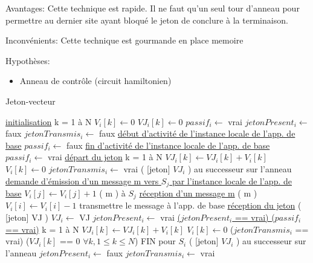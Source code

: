 \documentclass[a4paper,11pt]{article}
\begin{document}
Avantages: Cette technique est rapide. Il ne faut qu'un seul tour d’anneau pour permettre au dernier site ayant bloqué le jeton de conclure à la terminaison.

Inconvénients: Cette technique est gourmande en place memoire

Hypothèses:
\begin{itemize}
    \item Anneau de contrôle (circuit hamiltonien)
\end{itemize}

\begin{algorithm}
\DontPrintSemicolon
\SetAlgoVlined
\LinesNumbered

\caption{Jeton-vecteur}

\underline{initialisation} \;
  \Indp
  \pour k = 1 à N \faire \;
    \Indp
    $V_{i}[k] \gets 0$ \;
    $VJ_{i}[k] \gets 0$ \;
    \Indm
  \finpour \;
  $passif_{i} \gets$ vrai \;
  $jetonPresent_{i} \gets$ faux \;
  $jetonTransmis_{i} \gets$ faux \;
  \Indm
\underline{début d'activité de l'instance locale de l'app. de base} \;
  \Indp
  $passif_{i} \gets$ faux \;
  \Indm
\underline{fin d'activité de l'instance locale de l'app. de base} \;
  \Indp
  $passif_{i} \gets$ vrai \;
  \Indm
\underline{départ du jeton} \;
  \Indp
  \pour k = 1 à N \faire \;
    \Indp
    $VJ_{i}[k] \gets VJ_{i}[k] + V_{i}[k]$ \;
    $V_{i}[k] \gets 0$ \;
    \Indm
  \finpour \;
  $jetonTransmis_{i} \gets$ vrai \;
  \envoyer( [jeton] $VJ_{i}$ ) au successeur sur l'anneau \;
  \Indm
\underline{demande d'émission d'un message m vers $S_{j}$ par l'instance locale de l'app. de base} \;
  \Indp
  $V_{i}[j] \gets V_{i}[j] + 1$ \;
  \envoyer( m ) à $S_{j}$ \;
  \Indm
\underline{réception d'un message m} \;
  \Indp
  \recevoir( m ) \;
  $V_{i}[i] \gets V_{i}[i] - 1$ \;
  transmettre le message à l'app. de base \;
  \Indm
\underline{réception du jeton} \;
  \Indp
  \recevoir( [jeton] VJ ) \;
  $VJ_{i} \gets$ VJ \;
  $jetonPresent_{i} \gets $ vrai \;
  \Indm
\underline{($jetonPresent_{i}$ == vrai) \et ($passif_{i}$ == vrai)} \;
  \Indp
  \pour k = 1 à N \faire \;
    \Indp
    $VJ_{i}[k] \gets VJ_{i}[k] + V_{i}[k]$ \;
    $V_{i}[k] \gets 0$ \;
    \Indm
  \finpour \;
  \si ($jetonTransmis_{i}$ == vrai) \et ($VJ_{i}[k]$ == 0 $\forall k, 1 \leq k \leq N$) \alors \;
    \Indp
    FIN pour $S_{i}$ \;
    \Indm
  \finsi \;
  \envoyer( [jeton] $VJ_{i}$ ) au successeur sur l'anneau \;
  $jetonPresent_{i} \gets$ faux \;
  $jetonTransmis_{i} \gets$ vrai \;
  \Indm
\end{algorithm}
\end{document}
